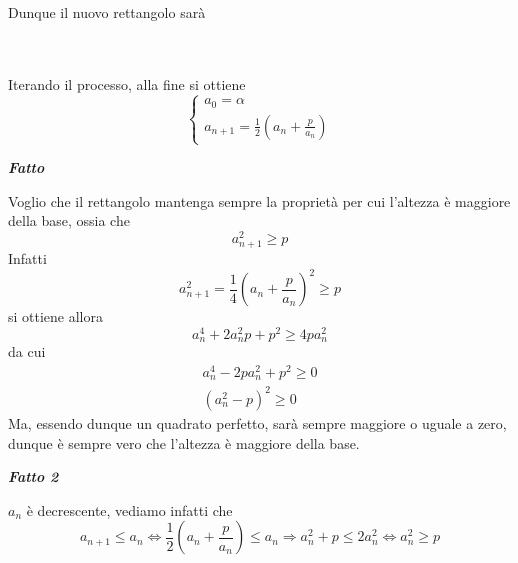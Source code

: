 \documentclass{article}
\theoremstyle{definition}
\begin{document}
\\
Dunque il nuovo rettangolo sarà
\\
\\
\\
Iterando il processo, alla fine si ottiene
\begin{equation}
    \begin{cases}
        a_0=\alpha \\
        a_{n+1}=\frac{1}{2}(a_n+\frac{p}{a_n})
    \end{cases}
\end{equation}
\newpage
\begin{center}
    \textbf{\textit{Fatto}}
\end{center}
Voglio che il rettangolo mantenga sempre la proprietà per cui l'altezza è maggiore della base, ossia che
\begin{equation}
    a_{n+1}^2\geqslant p
\end{equation}
Infatti
\begin{equation}
    a_{n+1}^2=\frac{1}{4}(a_n+\frac{p}{a_n})^2\geqslant p
\end{equation}
si ottiene allora
\begin{equation}
    a_n^4+2a_n^2p+p^2 \geqslant 4pa_n^2
\end{equation}
da cui
\begin{align*}
    a_n^4-2pa_n^2+p^2 \geqslant 0\\
    (a_n^2-p)^2 \geqslant 0
\end{align*}
Ma, essendo dunque un quadrato perfetto, sarà sempre maggiore o uguale a zero, dunque è sempre vero che l'altezza è maggiore della base.
\\
\begin{center}
    \textbf{\textit{Fatto 2}}
\end{center}
$a_n$ è decrescente, vediamo infatti che 
\begin{equation}
    a_{n+1} \leqslant a_n \Longleftrightarrow \frac{1}{2}(a_n+\frac{p}{a_n}) \leqslant a_n \Rightarrow a_n^2 + p \leqslant 2a_n^2 \Longleftrightarrow a_n^2 \geqslant p 
\end{equation}
\end{document}
